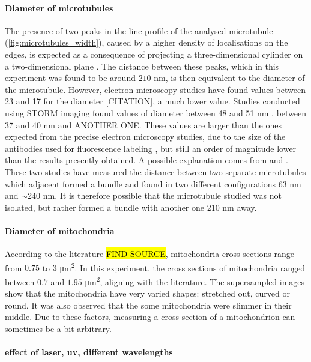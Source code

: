 \paragraph{Diameter of microtubules}
The presence of two peaks in the line profile of the analysed microtubule (\autoref{fig:microtubules_width}), caused by a higher density of localisations on the edges, is expected as a consequence of projecting a three-dimensional cylinder on a two-dimensional plane \cite{douglass_notice_2023}.
The distance between these peaks, which in this experiment was found to be around $210$ nm, is then equivalent to the diameter of the microtubule.
However, electron microscopy studies have found values between 23 and 17 for the diameter [CITATION], a much lower value.
Studies conducted using STORM imaging found values of diameter between 48 and 51 nm \cite{bharadwaj_advancing_2024}, between 37 and 40 nm \cite{douglass_super-resolution_2016} and ANOTHER ONE.
These values are larger than the ones expected from the precise electron microscopy studies, due to the size of the antibodies used for fluorescence labeling \cite{douglass_notice_2023}, but still an order of magnitude lower than the results presently obtained.
A possible explanation comes from \cite{dong_stochastic_2015} and \cite{wang_blind_2017}.
These two studies have measured the distance between two separate microtubules which adjacent formed a bundle and found in two different configurations 63 nm and $\sim$240 nm.
It is therefore possible that the microtubule studied was not isolated, but rather formed a bundle with another one 210 nm away.

\paragraph{Diameter of mitochondria}
According to the literature \hl{FIND SOURCE}, mitochondria cross sections range from $0.75$ to $3$ \si{\micro\meter\squared}. In this experiment, the cross sections of mitochondria ranged between $0.7$ and $1.95$ \si{\micro\meter\squared}, aligning with the literature. The supersampled images show that the mitochondria have very varied shapes: stretched out, curved or round. It was also observed that the some mitochondria were slimmer in their middle. Due to these factors, measuring a cross section of a mitochondrion can sometimes be a bit arbitrary.

\paragraph{effect of laser, uv, different wavelengths}

